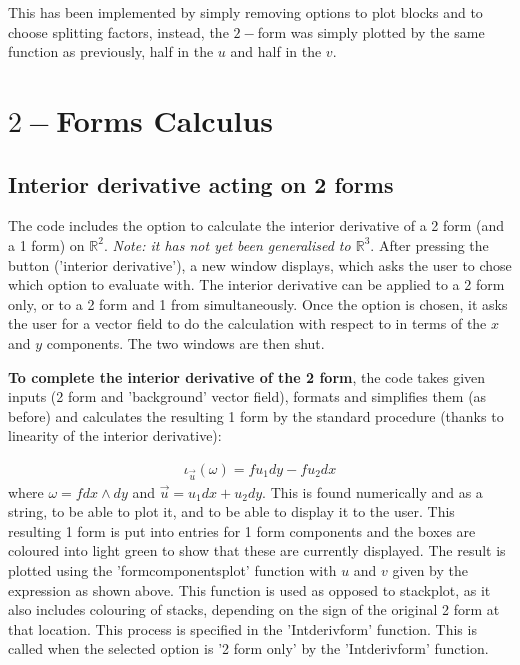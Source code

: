 \documentclass[12pt]{report}
\begin{document}
This has been implemented by simply removing options to plot blocks and to choose splitting factors, instead, the $2-$form was simply plotted by the same function as previously, half in the $u$ and half in the $v$.

\chapter {$2-$Forms Calculus}
\section{Interior derivative acting on 2 forms}
The code includes the option to calculate the interior derivative of a 2 form (and a 1 form) on $\mathbb{R}^{2}$. \textit{Note: it has not yet been generalised to $\mathbb{R}^{3}$}. After pressing the button ('interior derivative'), a new window displays, which asks the user to chose which option to evaluate with. The interior derivative can be applied to a 2 form only, or to a 2 form and 1 from simultaneously. Once the option is chosen, it asks the user for a vector field to do the calculation with respect to in terms of the $x$ and $y$ components. The two windows are then shut.

\noindent \textbf{To complete the interior derivative of the 2 form}, the code takes given inputs (2 form and 'background' vector field), formats and simplifies them (as before) and calculates the resulting 1 form by the standard procedure (thanks to linearity of the interior derivative):

\begin{equation}
	\label{T2} \begin{split}
		\iota_{\vec{u}}(\omega) = f u_{1} dy - f u_{2} dx
	\end{split}
\end{equation}
where $\omega = f dx\wedge dy$ and $\vec{u} = u_{1}dx + u_{2}dy$.
This is found numerically and as a string, to be able to plot it, and to be able to display it to the user.
This resulting 1 form is put into entries for 1 form components and the boxes are coloured into light green to show that these are currently displayed. The result is plotted using the 'form\textunderscore components\textunderscore plot' function with $u$ and $v$ given by the expression as shown above. This function is used as opposed to stack\textunderscore plot, as it also includes colouring of stacks, depending on the sign of the original 2 form at that location.
This process is specified in the 'Int\textunderscore deriv\textunderscore form' function. This is called when the selected option is '2 form only' by the 'Int\textunderscore deriv\textunderscore form' function.
\end{document}
